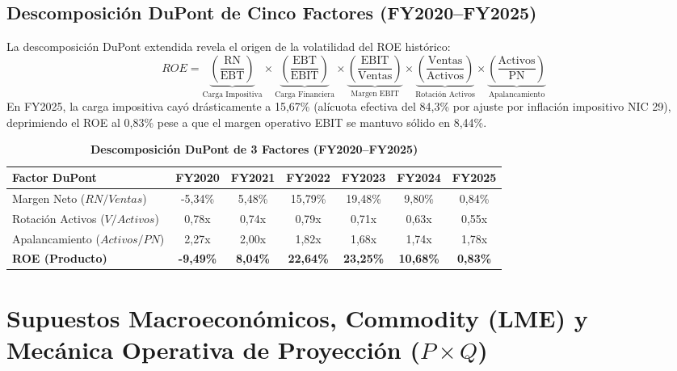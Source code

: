 \documentclass[10pt,a4paper]{article}
\begin{document}
\subsection{Descomposición DuPont de Cinco Factores (FY2020--FY2025)}
La descomposición DuPont extendida revela el origen de la volatilidad del ROE histórico:
\begin{equation}
    ROE = \underbrace{\left(\frac{\text{RN}}{\text{EBT}}\right)}_{\text{Carga Impositiva}} \times \underbrace{\left(\frac{\text{EBT}}{\text{EBIT}}\right)}_{\text{Carga Financiera}} \times \underbrace{\left(\frac{\text{EBIT}}{\text{Ventas}}\right)}_{\text{Margen EBIT}} \times \underbrace{\left(\frac{\text{Ventas}}{\text{Activos}}\right)}_{\text{Rotación Activos}} \times \underbrace{\left(\frac{\text{Activos}}{\text{PN}}\right)}_{\text{Apalancamiento}}
\end{equation}
En FY2025, la carga impositiva cayó drásticamente a 15,67\% (alícuota efectiva del 84,3\% por ajuste por inflación impositivo NIC 29), deprimiendo el ROE al 0,83\% pese a que el margen operativo EBIT se mantuvo sólido en 8,44\%.

\begin{table}[H]
\centering
\caption{\textbf{Descomposición DuPont de 3 Factores (FY2020--FY2025)}}
\small
\begin{tabularx}{\textwidth}{Xcccccc}
\toprule
\textbf{Factor DuPont} & \textbf{FY2020} & \textbf{FY2021} & \textbf{FY2022} & \textbf{FY2023} & \textbf{FY2024} & \textbf{FY2025} \\
\midrule
Margen Neto ($RN / Ventas$) & -5,34\% & 5,48\% & 15,79\% & 19,48\% & 9,80\% & 0,84\% \\
Rotación Activos ($V / Activos$) & 0,78x & 0,74x & 0,79x & 0,71x & 0,63x & 0,55x \\
Apalancamiento ($Activos / PN$) & 2,27x & 2,00x & 1,82x & 1,68x & 1,74x & 1,78x \\
\midrule
\textbf{ROE (Producto)} & \textbf{-9,49\%} & \textbf{8,04\%} & \textbf{22,64\%} & \textbf{23,25\%} & \textbf{10,68\%} & \textbf{0,83\%} \\
\bottomrule
\end{tabularx}
\end{table}

\section{Supuestos Macroeconómicos, Commodity (LME) y Mecánica Operativa de Proyección \texorpdfstring{($P\times Q$)}{(P x Q)}}
\end{document}
